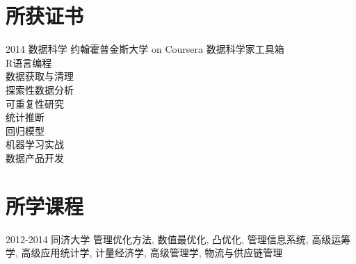 \documentclass[print]{friggeri-cv} %
\begin{document}
\section{所获证书}

\begin{entrylist}
\entry
{2014}
{数据科学}
{约翰霍普金斯大学 on Coursera}
{数据科学家工具箱\\
 R语言编程\\
数据获取与清理\\
探索性数据分析\\
可重复性研究\\
统计推断\\
回归模型\\
机器学习实战\\
数据产品开发}
\end{entrylist}












\section{所学课程}
\begin{entrylist}
\entry
{2012-2014}
{}
{同济大学}
{管理优化方法,
数值最优化,
凸优化, 
管理信息系统,
高级运筹学,
高级应用统计学,
计量经济学,
高级管理学,
物流与供应链管理
}
\end{entrylist}




\end{document}
